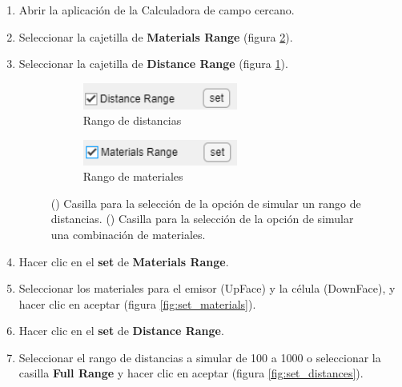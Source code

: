 \begin{enumerate}
	\item Abrir la aplicación de la Calculadora de campo cercano.
	\item Seleccionar la cajetilla de \textbf{Materials Range} (figura \ref{fig:check_materials}). 
	\item Seleccionar la cajetilla de \textbf{Distance Range} (figura \ref{fig:check_distances}).
	\begin{figure}[H]%
	\begin{subfigure}[b]{0.48\textwidth}
		\centering
			\includegraphics[width=0.6\textwidth]{figuras/Procedimiento_Simulaciones/Radiacion/check_distances2.png}
		\caption{Rango de distancias}
		\label{fig:check_distances}
	\end{subfigure}
	\hfill
	\begin{subfigure}[b]{0.48\textwidth}
		\centering
			\includegraphics[width=0.6\textwidth]{figuras/Procedimiento_Simulaciones/Radiacion/check_materials2.png}
		\caption{Rango de materiales}
		\label{fig:check_materials}
	\end{subfigure}
	\caption{() Casilla para la selección de la opción de simular un rango de distancias. () Casilla para la selección de la opción de simular una combinación de materiales.}%
	\label{fig:checkboxes}%
	\end{figure}
	\item Hacer clic en el \textbf{set} de \textbf{Materials Range}.
	\item Seleccionar los materiales para el emisor (UpFace) y la célula (DownFace), y hacer clic en aceptar (figura \ref{fig:set_materials}).
	\item Hacer clic en el \textbf{set} de \textbf{Distance Range}.	
	\item Seleccionar el rango de distancias a simular de 100 a 1000 o seleccionar la casilla \textbf{Full Range} y hacer clic en aceptar (figura \ref{fig:set_distances}).%
	\begin{figure}[H]%
	\begin{subfigure}[b]{0.48\textwidth}

\end{subfigure}
\end{figure}
\end{enumerate}
